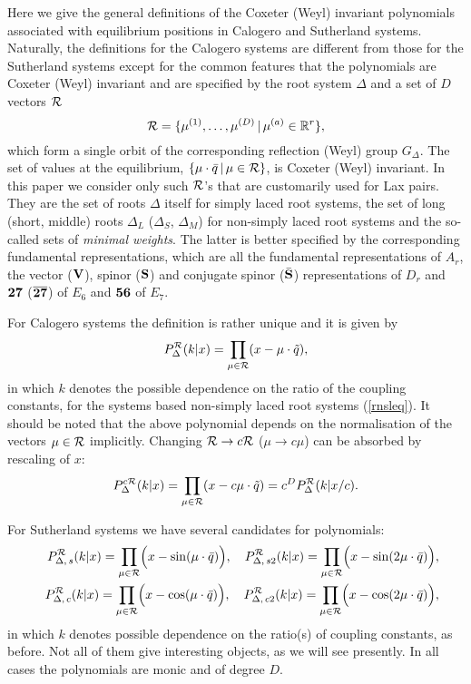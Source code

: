 \documentclass[a4paper,12pt]{article}
\begin{document}
Here we give the general definitions of the Coxeter (Weyl) invariant
polynomials associated with equilibrium positions in Calogero and
Sutherland systems. Naturally, the definitions for the Calogero systems
are different from those for the Sutherland systems except for the common
features that the polynomials are Coxeter (Weyl) invariant and are
specified by the root system $\Delta$ and a set of $D$ vectors ${\cal R}$
\begin{equation}
   {\cal R}=\{\mu^{(1)},\ldots,\mu^{(D)}\,|\,\mu^{(a)}\in {\mathbb R}^r\},
\end{equation}
which form a single orbit of the corresponding reflection (Weyl) group
$G_\Delta$. The set of values at the equilibrium,
$\{\mu\cdot\bar{q}\,|\,\mu\in{\cal R}\}$, is Coxeter (Weyl) invariant.
In this paper we consider only such ${\cal R}$'s that are customarily
used for Lax pairs.
They are the set of roots $\Delta$ itself for simply laced root systems,
the set of long (short, middle) roots $\Delta_L$ ($\Delta_S$, $\Delta_M$)
for non-simply laced root  systems and the so-called sets of
{\em minimal weights\/}.
The latter is better specified by the corresponding fundamental
representations, which are all the fundamental representations of $A_r$,
the vector ($\bf V$), spinor ($\bf S$) and conjugate spinor ($\bar{\bf S}$)
representations of $D_r$ and $\bf 27$ ($\overline{\bf 27}$) of $E_6$
and $\bf 56$ of $E_7$.

For Calogero systems the definition is rather unique and  it is given by
\begin{equation}
   P_{\Delta}^{\cal R}(k |x)=\prod_{\mu\in{\cal R}}(x-\mu\cdot\tilde{q}),
   \label{calpolydef}
\end{equation}
in which $k$ denotes the possible dependence on the ratio of the coupling
constants, for the systems based non-simply laced root systems (\ref{rnsleq}).
It should be noted that the above polynomial depends on the normalisation
of the vectors $\mu\in{\cal R}$ implicitly. Changing ${\cal R}\to c{\cal R}$
($\mu\to c\mu$) can be absorbed by rescaling of $x$:
\begin{equation}
   P_{\Delta}^{c\cal R}(k |x)=\prod_{\mu\in{\cal R}}(x-c\mu\cdot\tilde{q})=
   c^DP_{\Delta}^{\cal R}(k |x/c).
\end{equation}

For Sutherland systems we have several candidates for polynomials:
\begin{eqnarray}
   &&P_{\Delta,\, s}^{\cal R}(k|x)=
   \prod_{\mu\in{\cal R}}\Bigl(x-\sin(\mu\cdot\bar{q})\Bigr),\quad
   P_{\Delta,\, s2}^{\cal R}(k|x)=
   \prod_{\mu\in{\cal R}}\Bigl(x-\sin(2\mu\cdot\bar{q})\Bigr),
   \label{sutpolysdef}\\
%
   &&P_{\Delta,\, c}^{\cal R}(k|x)=
   \prod_{\mu\in{\cal R}}\Bigl(x-\cos(\mu\cdot\bar{q})\Bigr),\quad
   P_{\Delta,\, c2}^{\cal R}(k|x)=
   \prod_{\mu\in{\cal R}}\Bigl(x-\cos(2\mu\cdot\bar{q})\Bigr),
   \label{sutpolycdef}
\end{eqnarray}
in which $k$ denotes possible dependence on the ratio(s) of coupling constants,
as before. Not all of them give interesting objects, as we will see presently.
In all cases the polynomials are monic and of degree $D$.
\end{document}
